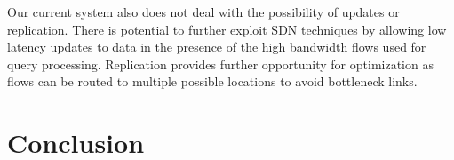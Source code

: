 \documentclass{sig-alternate-2013}
\begin{document}
Our current system also does not deal with the possibility of updates or replication.
There is potential to further exploit SDN techniques by allowing low latency updates to data in the presence of the high bandwidth flows used for query processing.
Replication provides further opportunity for optimization as flows can be routed to multiple possible locations to avoid bottleneck links.


\section{Conclusion}

\let\theOLDbibliography\thebibliography\renewcommand{\thebibliography}[1]{\theOLDbibliography{#1}%
\item[]\vspace*{0.5mm}}


{\scriptsize

}
\end{document}
